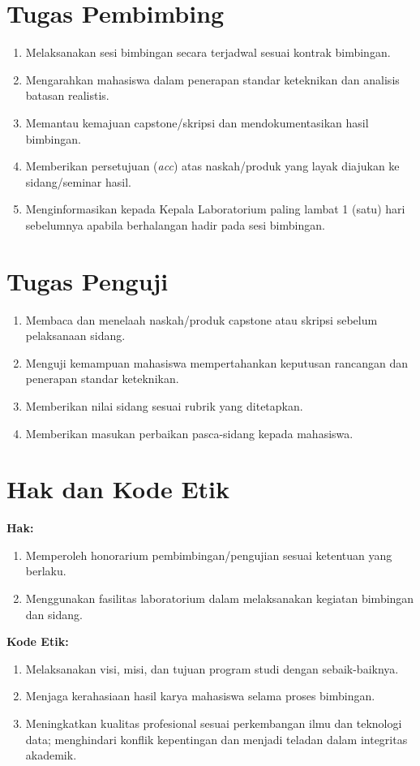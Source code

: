 \documentclass[12pt,a4paper]{report}
\begin{document}
\section{Tugas Pembimbing}
\begin{enumerate}
\item Melaksanakan sesi bimbingan secara terjadwal sesuai kontrak bimbingan.
\item Mengarahkan mahasiswa dalam penerapan standar keteknikan dan analisis batasan realistis.
\item Memantau kemajuan capstone/skripsi dan mendokumentasikan hasil bimbingan.
\item Memberikan persetujuan (\emph{acc}) atas naskah/produk yang layak diajukan ke sidang/seminar hasil.
\item Menginformasikan kepada Kepala Laboratorium paling lambat 1 (satu) hari sebelumnya apabila berhalangan hadir pada sesi bimbingan.
\end{enumerate}

\section{Tugas Penguji}
\begin{enumerate}
\item Membaca dan menelaah naskah/produk capstone atau skripsi sebelum pelaksanaan sidang.
\item Menguji kemampuan mahasiswa mempertahankan keputusan rancangan dan penerapan standar keteknikan.
\item Memberikan nilai sidang sesuai rubrik yang ditetapkan.
\item Memberikan masukan perbaikan pasca-sidang kepada mahasiswa.
\end{enumerate}

\section{Hak dan Kode Etik}
\textbf{Hak:}
\begin{enumerate}
\item Memperoleh honorarium pembimbingan/pengujian sesuai ketentuan yang berlaku.
\item Menggunakan fasilitas laboratorium dalam melaksanakan kegiatan bimbingan dan sidang.
\end{enumerate}
\textbf{Kode Etik:}
\begin{enumerate}
\item Melaksanakan visi, misi, dan tujuan program studi dengan sebaik-baiknya.
\item Menjaga kerahasiaan hasil karya mahasiswa selama proses bimbingan.
\item Meningkatkan kualitas profesional sesuai perkembangan ilmu dan teknologi data; menghindari konflik kepentingan dan menjadi teladan dalam integritas akademik.
\end{enumerate}
\end{document}
